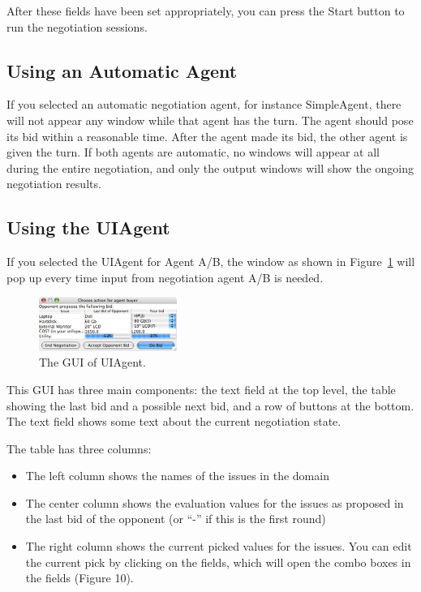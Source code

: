 \documentclass[]{article}
\begin{document}
After these fields have been set appropriately, you can press the Start button to run the negotiation sessions.

\subsection{Using an Automatic Agent}

If you selected an automatic negotiation agent, for instance SimpleAgent, there will not appear any window while that agent has the turn. The agent should pose its bid within a reasonable time. After the agent made its bid, the other agent is given the turn. If both agents are automatic, no windows will appear at all during the entire negotiation, and only the output windows will show the ongoing negotiation results.


	\subsection{Using the UIAgent}

	If you selected the UIAgent for Agent A/B, the window as shown in Figure~\ref{Fig:uiagent gui} will pop up every time input from negotiation agent A/B is needed.

	\begin{figure}[htb]
		\centering
		\includegraphics[width=0.4\textwidth]{media/image12.png}
	\caption{The GUI of UIAgent.}\label{Fig:uiagent gui}
	\end{figure}

	This GUI has three main components: the text field at the top level, the table showing the last bid and a possible next bid, and a row of buttons at the bottom.
	The text field shows some text about the current negotiation state.

	The table has three columns: 
	\begin{itemize}
		\item The left column shows the names of the issues in the domain
		\item The center column shows the evaluation values for the issues as proposed in the last bid of the opponent (or ``-'' if this is the first round)
		\item The right column shows the current picked values for the issues. You can edit the current pick by clicking on the fields, which will open the combo boxes in the fields (Figure 10).
	\end{itemize}
\end{document}
